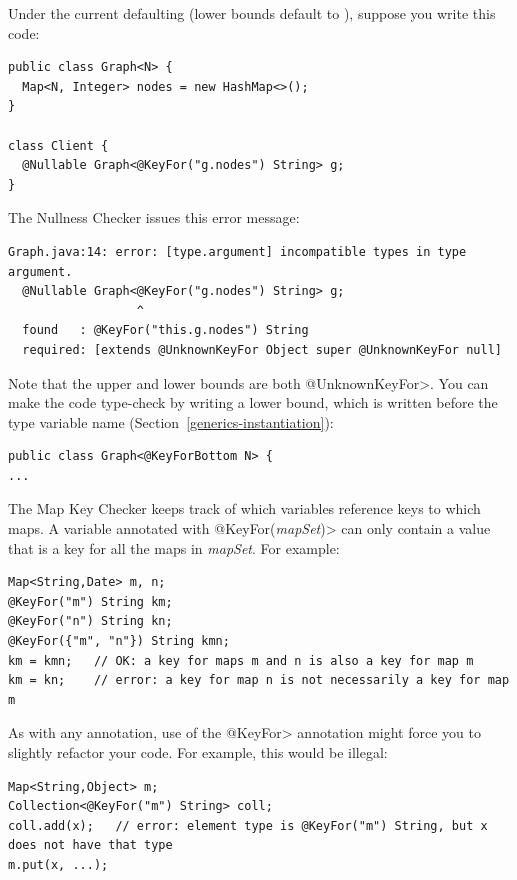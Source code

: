 Under the current defaulting (lower bounds default to
), suppose you write this code:

\begin{Verbatim}
public class Graph<N> {
  Map<N, Integer> nodes = new HashMap<>();
}

class Client {
  @Nullable Graph<@KeyFor("g.nodes") String> g;
}
\end{Verbatim}

\noindent
The Nullness Checker issues this error message:

\begin{Verbatim}
Graph.java:14: error: [type.argument] incompatible types in type argument.
  @Nullable Graph<@KeyFor("g.nodes") String> g;
                  ^
  found   : @KeyFor("this.g.nodes") String
  required: [extends @UnknownKeyFor Object super @UnknownKeyFor null]
\end{Verbatim}

Note that the upper and lower bounds are both \<@UnknownKeyFor>.  You can
make the code type-check by writing a lower bound, which is written before
the type variable name (Section~\ref{generics-instantiation}):

\begin{Verbatim}
public class Graph<@KeyForBottom N> {
...
\end{Verbatim}



The Map Key Checker keeps track of which variables reference keys to
which maps.  A variable annotated with \<@KeyFor(\emph{mapSet})> can only
contain a value that is a key for all the maps in \emph{mapSet}.  For example:

\begin{verbatim}
Map<String,Date> m, n;
@KeyFor("m") String km;
@KeyFor("n") String kn;
@KeyFor({"m", "n"}) String kmn;
km = kmn;   // OK: a key for maps m and n is also a key for map m
km = kn;    // error: a key for map n is not necessarily a key for map m
\end{verbatim}


As with any annotation, use of the \<@KeyFor> annotation might force you to
slightly refactor your code.  For example, this would be illegal:

\begin{verbatim}
Map<String,Object> m;
Collection<@KeyFor("m") String> coll;
coll.add(x);   // error: element type is @KeyFor("m") String, but x does not have that type
m.put(x, ...);
\end{verbatim}

